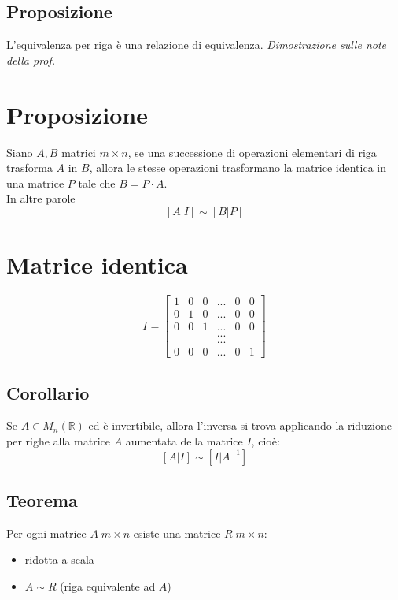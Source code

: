 \subsection{Proposizione}
L'equivalenza per riga è una relazione di equivalenza.
\textit{Dimostrazione sulle note della prof.}

\section{Proposizione}
Siano \(A, B\) matrici \(m\times n\), se una successione di operazioni elementari di riga trasforma \(A\) in \(B\), allora le stesse operazioni trasformano la matrice identica in una matrice \(P\) tale che \(B=P\cdot A\).
\\In altre parole
\[[A|I]\sim [B|P]\]

\section{Matrice identica}
\begin{equation*}
I = 
\begin{bmatrix}
1 & 0 & 0 & ... &0 & 0\\
0 & 1 & 0 & ... &0 & 0\\
0 & 0 & 1 & ... &0 & 0\\
& &&...\\
& &&...\\
0&0&0&... &0&1
\end{bmatrix}
\end{equation*}

\subsection{Corollario}
Se \(A\in M_n(\mathbb{R})\) ed è invertibile, allora l'inversa si trova applicando la riduzione per righe alla matrice \(A\) aumentata della matrice \(I\), cioè:
\[[A|I]\sim [I|A^{-1}]\]

\subsection{Teorema}
Per ogni matrice \(A\;m\times n\) esiste una matrice \(R\;m\times n\):
\begin{itemize}
	\item ridotta a scala
	\item \(A\sim R\) (riga equivalente ad \(A\))
\end{itemize}

